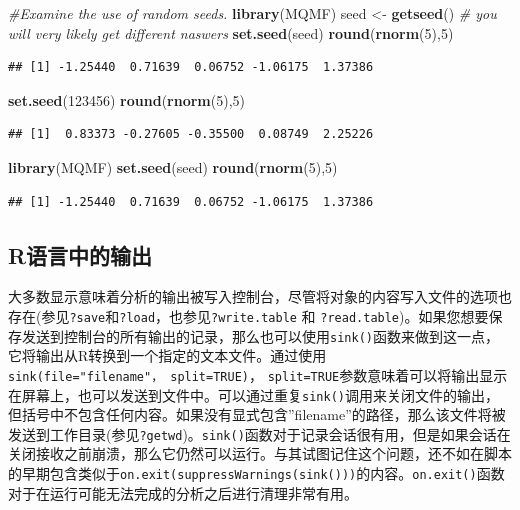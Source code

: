 \documentclass[
  lang=cn,
  11pt,
  scheme=chinese,
  chinesefont=nofont,
  citestyle=gb7714-2015,
  bibstyle=gb7714-2015]{elegantbook}
\newenvironment{Shaded}{\begin{snugshade}}{\end{snugshade}}
\newcommand{\CommentTok}[1]{\textcolor[rgb]{0.56,0.35,0.01}{\textit{#1}}}
\newcommand{\DecValTok}[1]{\textcolor[rgb]{0.00,0.00,0.81}{#1}}
\newcommand{\FunctionTok}[1]{\textcolor[rgb]{0.13,0.29,0.53}{\textbf{#1}}}
\newcommand{\NormalTok}[1]{#1}
\newcommand{\OtherTok}[1]{\textcolor[rgb]{0.56,0.35,0.01}{#1}}
\begin{document}
\begin{Shaded}
\begin{Highlighting}[]
 \CommentTok{\#Examine the use of random seeds.}
\FunctionTok{library}\NormalTok{(MQMF)}
\NormalTok{seed }\OtherTok{\textless{}{-}} \FunctionTok{getseed}\NormalTok{()  }\CommentTok{\# you will very likely get different naswers}
\FunctionTok{set.seed}\NormalTok{(seed)  }
\FunctionTok{round}\NormalTok{(}\FunctionTok{rnorm}\NormalTok{(}\DecValTok{5}\NormalTok{),}\DecValTok{5}\NormalTok{)  }
\end{Highlighting}
\end{Shaded}

\begin{verbatim}
## [1] -1.25440  0.71639  0.06752 -1.06175  1.37386
\end{verbatim}

\begin{Shaded}
\begin{Highlighting}[]
\FunctionTok{set.seed}\NormalTok{(}\DecValTok{123456}\NormalTok{)  }
\FunctionTok{round}\NormalTok{(}\FunctionTok{rnorm}\NormalTok{(}\DecValTok{5}\NormalTok{),}\DecValTok{5}\NormalTok{)  }
\end{Highlighting}
\end{Shaded}

\begin{verbatim}
## [1]  0.83373 -0.27605 -0.35500  0.08749  2.25226
\end{verbatim}

\begin{Shaded}
\begin{Highlighting}[]
\FunctionTok{library}\NormalTok{(MQMF)}
\FunctionTok{set.seed}\NormalTok{(seed)  }
\FunctionTok{round}\NormalTok{(}\FunctionTok{rnorm}\NormalTok{(}\DecValTok{5}\NormalTok{),}\DecValTok{5}\NormalTok{)  }
\end{Highlighting}
\end{Shaded}

\begin{verbatim}
## [1] -1.25440  0.71639  0.06752 -1.06175  1.37386
\end{verbatim}

\subsection{R语言中的输出}\label{rux8bedux8a00ux4e2dux7684ux8f93ux51fa}

大多数显示意味着分析的输出被写入控制台，尽管将对象的内容写入文件的选项也存在(参见\texttt{?save}和\texttt{?load}，也参见\texttt{?write.table} 和 \texttt{?read.table})。如果您想要保存发送到控制台的所有输出的记录，那么也可以使用\texttt{sink()}函数来做到这一点，它将输出从R转换到一个指定的文本文件。通过使用\texttt{sink(file="filename"，\ split=TRUE)}， \texttt{split=TRUE}参数意味着可以将输出显示在屏幕上，也可以发送到文件中。可以通过重复\texttt{sink()}调用来关闭文件的输出，但括号中不包含任何内容。如果没有显式包含''filename''的路径，那么该文件将被发送到工作目录(参见\texttt{?getwd})。\texttt{sink()}函数对于记录会话很有用，但是如果会话在关闭接收之前崩溃，那么它仍然可以运行。与其试图记住这个问题，还不如在脚本的早期包含类似于\texttt{on.exit(suppressWarnings(sink()))}的内容。\texttt{on.exit()}函数对于在运行可能无法完成的分析之后进行清理非常有用。
\end{document}
